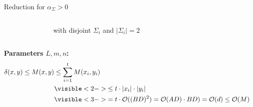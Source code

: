 \begin{frame}
\begin{exampleblock}{Reduction for $\alpha_\Sigma > 0$}
\begin{columns}
\begin{figure}
\begin{tikzpicture}
\end{tikzpicture}
\end{figure}
	\vspace{3ex}
	
	with disjoint $\Sigma_i$ and $|\Sigma_i| = 2$
	
\end{columns}
\end{exampleblock}

\textbf{Parameters $L,m,n$:}\\
\vspace{1ex}
\begin{align*}
	\delta(x,y) \leq M(x,y) &\leq \sum_{i=1}^{t} M(x_i, y_i)	\\
							&\visible<2->{\leq t \cdot |x_i| \cdot |y_i|}		\\
							&\visible<3->{= t \cdot \bigO{(BD)^2} = \bigO{AD} \cdot BD) = \bigO{d} \leq \bigO{M} }
\end{align*}


\end{frame}
